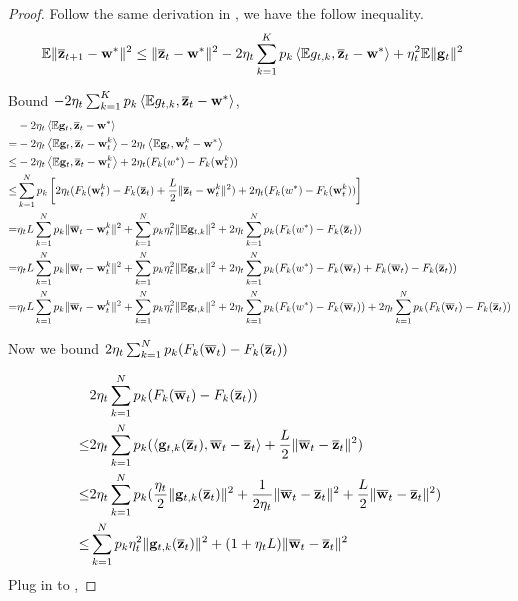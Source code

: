\begin{proof}
Follow the same derivation in \eq{\ref{eq:nagcvx1}}, we have the follow inequality.
\begin{align}
		\mathbb{E}\|\overline{{\mathbf{z}}}_{t+1} - {\mathbf{w}}^* \|^2  & \leq  \| \overline{{\mathbf{z}}}_{t} - {\mathbf{w}}^*\|^2  - 2\eta_t\sum_{k=1}^K p_k\left<\mathbb{E} g_{t,k}, \overline{{\mathbf{z}}}_{t} - {\mathbf{w}}^*\right> +  \eta_t^2\mathbb{E}\|{\mathbf{g}}_t\|^2 \label{eq:nasgdcvxsm0}
\end{align}

Bound $- 2\eta_t\sum_{k=1}^K p_k\left<\mathbb{E} g_{t,k}, \overline{{\mathbf{z}}}_{t} - {\mathbf{w}}^*\right>$, 
\begin{align}
	& -2 \eta_{t} \left<\mathbb{E} {\mathbf{g}}_{t}, {\overline{\mathbf{z}}}_{t}-{\mathbf{w}}^{*}\right> \nonumber \\
 =  & -2 \eta_{t} \left<\mathbb{E} {\mathbf{g}}_{t}, {\overline{\mathbf{z}}}_{t}- {\mathbf{w}}^{k}_t \right> -2 \eta_{t} \left<\mathbb{E} {\mathbf{g}}_{t}, {\mathbf{w}}^{k}_t - {\mathbf{w}}^{*}\right>\nonumber \\
 \leq & -2 \eta_{t} \left<\mathbb{E} {\mathbf{g}}_{t}, {\overline{\mathbf{z}}}_{t}- {\mathbf{w}}^{k}_t \right> + 2 \eta_{t} (F_k(w^*) - F_k({\mathbf{w}}^{k}_t))\nonumber \\
 \leq &\sum_{k=1}^N p_k \left[2 \eta_{t} (F_k({\mathbf{w}}^{k}_t) - F_k({\overline{\mathbf{z}}}_t) + \frac{L}{2} \|{\overline{\mathbf{z}}}_t - {\mathbf{w}}^{k}_t\|^2 ) + 2 \eta_{t} (F_k(w^*) - F_k({\mathbf{w}}^{k}_t))\right]\nonumber \\
 = & \eta_t L \sum_{k=1}^N p_k  \|{\overline{\mathbf{w}}}_t - {\mathbf{w}}^{k}_t\|^2  + \sum_{k=1}^N p_k\eta_t^2 \|\mathbb{E} {\mathbf{g}}_{t,k}\|^2 	 + 2 \eta_{t} \sum_{k=1}^N p_k (F_k(w^*) - F_k({\overline{\mathbf{z}}}_t)) 
  \label{eq:nasgdcvxsm1}\\
  = & \eta_t L \sum_{k=1}^N p_k  \|{\overline{\mathbf{w}}}_t - {\mathbf{w}}^{k}_t\|^2  + \sum_{k=1}^N p_k\eta_t^2 \|\mathbb{E} {\mathbf{g}}_{t,k}\|^2 	 + 2 \eta_{t} \sum_{k=1}^N p_k (F_k(w^*) - F_k({\overline{\mathbf{w}}}_t) +  F_k({\overline{\mathbf{w}}}_t) -  F_k({\overline{\mathbf{z}}}_t)) \\
  = & \eta_t L \sum_{k=1}^N p_k  \|{\overline{\mathbf{w}}}_t - {\mathbf{w}}^{k}_t\|^2  + \sum_{k=1}^N p_k\eta_t^2 \|\mathbb{E} {\mathbf{g}}_{t,k}\|^2 	 + 2 \eta_{t} \sum_{k=1}^N p_k (F_k(w^*) - F_k({\overline{\mathbf{w}}}_t)) +  2 \eta_{t} \sum_{k=1}^N p_k  (F_k({\overline{\mathbf{w}}}_t) -  F_k({\overline{\mathbf{z}}}_t)) \label{eq:nasgdcvxsm1}
\end{align}

Now we bound $2 \eta_{t} \sum_{k=1}^N p_k  (F_k({\overline{\mathbf{w}}}_t) -  F_k({\overline{\mathbf{z}}}_t)) $

\begin{align}
	 & 2 \eta_{t} \sum_{k=1}^N p_k  (F_k({\overline{\mathbf{w}}}_t) -  F_k({\overline{\mathbf{z}}}_t))  \\
\leq & 2 \eta_{t} \sum_{k=1}^N p_k  (\left<{\mathbf{g}}_{t,k}({\overline{\mathbf{z}}}_t), {\overline{\mathbf{w}}}_t - {\overline{\mathbf{z}}}_t\right> + \frac{L}{2}\|{\overline{\mathbf{w}}}_t - {\overline{\mathbf{z}}}_t\|^2)\\
\leq & 2 \eta_{t} \sum_{k=1}^N p_k (\frac{\eta_t}{2}\|{\mathbf{g}}_{t,k}({\overline{\mathbf{z}}}_t)\|^2 + \frac{1}{2\eta_t}\|{\overline{\mathbf{w}}}_t - {\overline{\mathbf{z}}}_t\|^2+ \frac{L}{2}\|{\overline{\mathbf{w}}}_t - {\overline{\mathbf{z}}}_t\|^2)\\
\leq & \sum_{k=1}^N p_k \eta_t^2\|{\mathbf{g}}_{t,k}({\overline{\mathbf{z}}}_t)\|^2 + (1+ \eta_t L)\|{\overline{\mathbf{w}}}_t - {\overline{\mathbf{z}}}_t\|^2 \label{eq:nasgdcvxsm2}
\end{align}
Plug in \eq{\ref{eq:nasgdcvxsm2}} to \eq{\ref{eq:nasgdcvxsm1}}, 


\end{proof}
